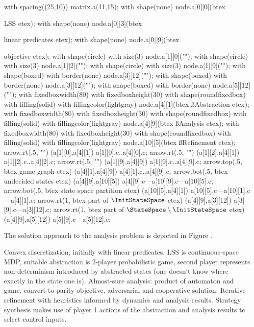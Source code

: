     with spacing((25,10)) matrix.a(11,15);
    with shape(none) node.a[0][0](btex \ssd \strut LSS etex);
    with shape(none) node.a[0][3](btex \ssd \strut linear predicates etex);
    with shape(none) node.a[0][9](btex \ssd \strut objective etex);
    with shape(circle) with size(3) node.a[1][0]("");
    with shape(circle) with size(3) node.a[1][2]("");
    with shape(circle) with size(3) node.a[1][9]("");
    with shape(boxed) with border(none) node.a[3][12]("");
    with shape(boxed) with border(none) node.a[3][12]("");
    with shape(boxed) with border(none) node.a[5][12]("");
    with fixedboxwidth(80) with fixedboxheight(30) with shape(roundfixedbox) with filling(solid) with fillingcolor(lightgray) node.a[4][1](btex \ss Abstraction etex);
    with fixedboxwidth(80) with fixedboxheight(30) with shape(roundfixedbox) with filling(solid) with fillingcolor(lightgray) node.a[4][9](btex \ss Analysis etex);
    with fixedboxwidth(80) with fixedboxheight(30) with shape(roundfixedbox) with filling(solid) with fillingcolor(lightgray) node.a[10][5](btex \ss Refinement etex);
    arrow.rt(.5, "") (a[1][0],a[4][1]) a[1][0].c..a[4][0].c;
    arrow.rt(.5, "") (a[1][2],a[4][1]) a[1][2].c..a[4][2].c;
    arrow.rt(.5, "") (a[1][9],a[4][9]) a[1][9].c..a[4][9].c;
    arrow.top(.5, btex \ssd game graph etex) (a[4][1],a[4][9]) a[4][1].c..a[4][9].c;
    arrow.bot(.5, btex \ssd undecided states etex) (a[4][9],a[10][5]) a[4][9].c---a[10][9].c---a[10][5].c;
    arrow.bot(.5, btex \ssd state space partition etex) (a[10][5],a[4][1]) a[10][5].c---a[10][1].c---a[4][1].c;
    arrow.rt(1, btex \ssd part of ${\InitStateSpace}$ etex) (a[4][9],a[3][12]) a[3][9].c---a[3][12].c;
    arrow.rt(1, btex \ssd part of ${\StateSpace \setminus \InitStateSpace}$ etex) (a[4][9],a[5][12]) a[5][9].c---a[5][12].c;
\stopreusableMPgraphic



The solution approach to the analysis problem is depicted in Figure .

Convex discretization, initially with linear predicates.
LSS is continuous-space MDP, suitable abstraction is 2-player probabilistic game, second player represents non-determinism introduced by abstracted states (one doesn't know where exactly in the state one is).
Almost-sure analysis: product of automaton and game, convert to parity objective, adversarial and cooperative solution.
Iterative refinement with heuristics informed by dynamics and analysis results.
Strategy synthesis makes use of player 1 actions of the abstraction and analysis results to select control inputs.

